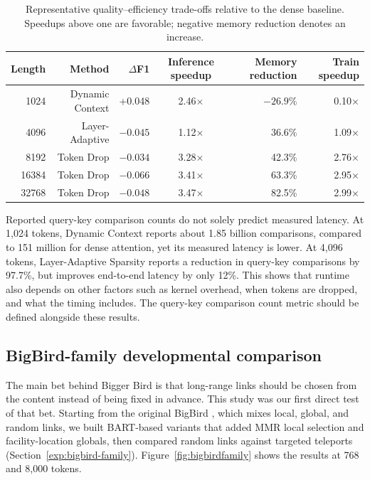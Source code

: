 \documentclass[11pt]{article}
\begin{document}
\begin{table}[H]
  \centering
  \small
  \caption{Representative quality--efficiency trade-offs relative to the dense
  baseline. Speedups above one are favorable; negative memory reduction denotes
  an increase.}
  \label{tab:tradeoffs}
  \begin{tabular}{@{}rrrcrr@{}}
    \toprule
    Length & Method & $\Delta$F1 & Inference speedup & Memory reduction & Train speedup \\
    \midrule
    1024  & Dynamic Context & +0.048 & 2.46$\times$ & $-26.9$\% & 0.10$\times$ \\
    4096  & Layer-Adaptive & $-0.045$ & 1.12$\times$ & 36.6\% & 1.09$\times$ \\
    8192  & Token Drop & $-0.034$ & 3.28$\times$ & 42.3\% & 2.76$\times$ \\
    16384 & Token Drop & $-0.066$ & 3.41$\times$ & 63.3\% & 2.95$\times$ \\
    32768 & Token Drop & $-0.048$ & 3.47$\times$ & 82.5\% & 2.99$\times$ \\
    \bottomrule
  \end{tabular}
\end{table}
Reported query-key comparison counts do not solely predict measured latency. At 1,024 tokens, Dynamic Context reports about 1.85 billion comparisons, compared to 151 million for dense attention, yet its measured latency is lower. At 4,096 tokens, Layer-Adaptive Sparsity reports a reduction in query-key comparisons by 97.7\%, but improves end-to-end latency by only 12\%. This shows that runtime also depends on other factors such as kernel overhead, when tokens are dropped, and what the timing includes. The query-key comparison count metric should be defined alongside these results.

\FloatBarrier
\subsection{BigBird-family developmental comparison}
\label{sec:bigbird-family-results}

The main bet behind Bigger Bird is that long-range links should be chosen
from the content instead of being fixed in advance. This study was our first direct test
of that bet. Starting from the original BigBird \citep{zaheer2020bigbird}, which
mixes local, global, and random links, we built BART-based variants that added
MMR local selection and facility-location globals, then compared random
links against targeted teleports (Section~\ref{exp:bigbird-family}).
Figure~\ref{fig:bigbirdfamily} shows the results at 768 and 8{,}000 tokens.
\end{document}
